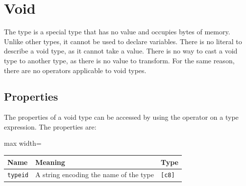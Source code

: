 \section{Void}
\label{sec:org409c2d8}

The  type is a special type that has no value and occupies
 bytes of memory. Unlike other types, it cannot be used to declare
variables. There is no literal to describe a void type, as it cannot take a
value. There is no way to cast a void type to another type, as there is no value
to transform. For the same reason, there are no operators applicable to void types.

\subsection{Properties}
\label{sec:orgffa98ee}

The properties of a void type can be accessed by using the \token{::} operator
on a type expression. The properties are:

\begin{center}
  \begin{adjustbox}{max width=\linewidth}
    \begin{tabular}{|l|ll|}
      \hline
      Name & Meaning & Type\\[0pt]
      \hline
      \hline
      \texttt{typeid} & A string encoding the name of the type & \texttt{[c8]}\\[0pt]
      \hline
    \end{tabular}
  \end{adjustbox}
\end{center}
